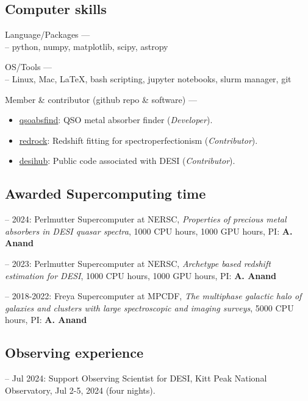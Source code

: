 \documentclass[12pt,letterpaper]{article}
\begin{document}
\subsection{Computer skills}
\begin{list}{}{\cvlist}
\item Language/Packages ---\\
    -- python, numpy, matplotlib, scipy, astropy
\item OS/Tools --- \\
    -- Linux, Mac, \LaTeX, bash scripting, jupyter notebooks, slurm manager, git
\item Member \& contributor (github repo \& software) ---
    \begin{itemize}
        \item[] \href{https://github.com/abhi0395/qsoabsfind}{qsoabsfind}: QSO metal absorber finder (\textit{Developer}).
      \item[] \href{https://github.com/desihub/redrock}{redrock}: Redshift fitting for spectroperfectionism (\textit{Contributor}).
      \item[] \href{https://github.com/desihub}{desihub}: Public code associated with DESI (\textit{Contributor}).
  \end{itemize}
\end{list}

\subsection{Awarded Supercomputing time}
\begin{list}{}{\cvlist}
\item -- 2024: Perlmutter Supercomputer at NERSC, \textit{Properties of         precious metal absorbers in DESI quasar spectra}, 1000 CPU hours, 1000 GPU      hours, PI: \textbf{A. Anand}
\item -- 2023: Perlmutter Supercomputer at NERSC,  \textit{Archetype based      redshift estimation for DESI}, 1000 CPU hours, 1000 GPU hours, PI: \textbf{A.   Anand}
\item -- 2018-2022: Freya Supercomputer at MPCDF,  \textit{The multiphase       galactic halo of galaxies and clusters with large spectroscopic and imaging     surveys}, 5000 CPU hours, PI: \textbf{A. Anand}
\end{list}

\subsection{Observing experience}
\begin{list}{}{\cvlist}
\item -- Jul 2024: Support Observing Scientist for DESI, Kitt Peak National     Observatory, Jul 2-5, 2024 (four nights).
\end{list}
\end{document}
